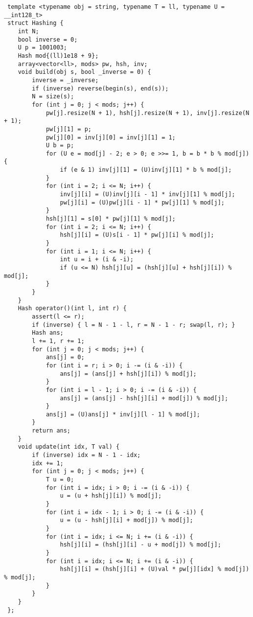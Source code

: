 \documentclass[11pt, a4paper, twoside]{article}
\begin{document}
\begin{lstlisting}
 template <typename obj = string, typename T = ll, typename U = __int128_t>
 struct Hashing {
 	int N;
 	bool inverse = 0;
 	U p = 1001003;
 	Hash mod{(ll)1e18 + 9};
 	array<vector<ll>, mods> pw, hsh, inv;
 	void build(obj s, bool _inverse = 0) {
 		inverse = _inverse;
 		if (inverse) reverse(begin(s), end(s));
 		N = size(s);
 		for (int j = 0; j < mods; j++) {
 			pw[j].resize(N + 1), hsh[j].resize(N + 1), inv[j].resize(N + 1);
 			pw[j][1] = p;
 			pw[j][0] = inv[j][0] = inv[j][1] = 1;
 			U b = p;
 			for (U e = mod[j] - 2; e > 0; e >>= 1, b = b * b % mod[j]) {
 				if (e & 1) inv[j][1] = (U)inv[j][1] * b % mod[j];
 			}
 			for (int i = 2; i <= N; i++) {
 				inv[j][i] = (U)inv[j][i - 1] * inv[j][1] % mod[j];
 				pw[j][i] = (U)pw[j][i - 1] * pw[j][1] % mod[j];
 			}
 			hsh[j][1] = s[0] * pw[j][1] % mod[j];
 			for (int i = 2; i <= N; i++) {
 				hsh[j][i] = (U)s[i - 1] * pw[j][i] % mod[j];
 			}
 			for (int i = 1; i <= N; i++) {
 				int u = i + (i & -i);
 				if (u <= N) hsh[j][u] = (hsh[j][u] + hsh[j][i]) % mod[j];
 			}
 		}
 	}
 	Hash operator()(int l, int r) {
 		assert(l <= r);
 		if (inverse) { l = N - 1 - l, r = N - 1 - r; swap(l, r); }
 		Hash ans;
 		l += 1, r += 1;
 		for (int j = 0; j < mods; j++) {
 			ans[j] = 0;
 			for (int i = r; i > 0; i -= (i & -i)) {
 				ans[j] = (ans[j] + hsh[j][i]) % mod[j];
 			}
 			for (int i = l - 1; i > 0; i -= (i & -i)) {
 				ans[j] = (ans[j] - hsh[j][i] + mod[j]) % mod[j];
 			}
 			ans[j] = (U)ans[j] * inv[j][l - 1] % mod[j];
 		}
 		return ans;
 	}
 	void update(int idx, T val) {
 		if (inverse) idx = N - 1 - idx;
 		idx += 1;
 		for (int j = 0; j < mods; j++) {
 			T u = 0;
 			for (int i = idx; i > 0; i -= (i & -i)) {
 				u = (u + hsh[j][i]) % mod[j];
 			}
 			for (int i = idx - 1; i > 0; i -= (i & -i)) {
 				u = (u - hsh[j][i] + mod[j]) % mod[j];
 			}
 			for (int i = idx; i <= N; i += (i & -i)) {
 				hsh[j][i] = (hsh[j][i] - u + mod[j]) % mod[j];
 			}
 			for (int i = idx; i <= N; i += (i & -i)) {
 				hsh[j][i] = (hsh[j][i] + (U)val * pw[j][idx] % mod[j]) % mod[j];
 			}
 		}
 	}
 };
\end{lstlisting}
\end{document}
